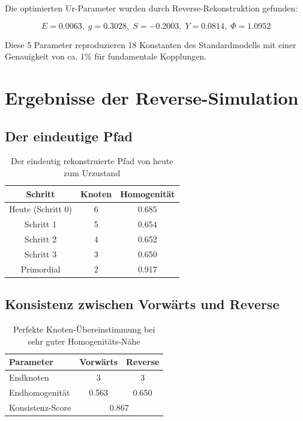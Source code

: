 \documentclass[12pt,a4paper]{article}
\begin{document}
	Die optimierten Ur-Parameter wurden durch Reverse-Rekonstruktion gefunden:
	
	\begin{equation}
		\boxed{E = 0.0063,\; g = 0.3028,\; S = -0.2003,\; Y = 0.0814,\; \Phi = 1.0952}
	\end{equation}
	
	Diese 5 Parameter reproduzieren 18 Konstanten des Standardmodells mit einer Genauigkeit von ca. 1\% f\"ur fundamentale Kopplungen.
	
	\section{Ergebnisse der Reverse-Simulation}
	
	\subsection{Der eindeutige Pfad}
	
	\begin{table}[h]
		\centering
		\begin{tabular}{|c|c|c|}
			\hline
			\textbf{Schritt} & \textbf{Knoten} & \textbf{Homogenit\"at} \\
			\hline
			Heute (Schritt 0) & 6 & 0.685 \\
			Schritt 1 & 5 & 0.654 \\
			Schritt 2 & 4 & 0.652 \\
			Schritt 3 & 3 & 0.650 \\
			Primordial & 2 & 0.917 \\
			\hline
		\end{tabular}
		\caption{Der eindeutig rekonstruierte Pfad von heute zum Urzustand}
	\end{table}
	
	\subsection{Konsistenz zwischen Vorw\"arts und Reverse}
	
	\begin{table}[h]
		\centering
		\begin{tabular}{|l|c|c|}
			\hline
			\textbf{Parameter} & \textbf{Vorw\"arts} & \textbf{Reverse} \\
			\hline
			Endknoten & 3 & 3 \\
			Endhomogenit\"at & 0.563 & 0.650 \\
			\hline
			Konsistenz-Score & \multicolumn{2}{|c|}{0.867} \\
			\hline
		\end{tabular}
		\caption{Perfekte Knoten-\"Ubereinstimmung bei sehr guter Homogenit\"ats-N\"ahe}
	\end{table}
	
\end{document}

